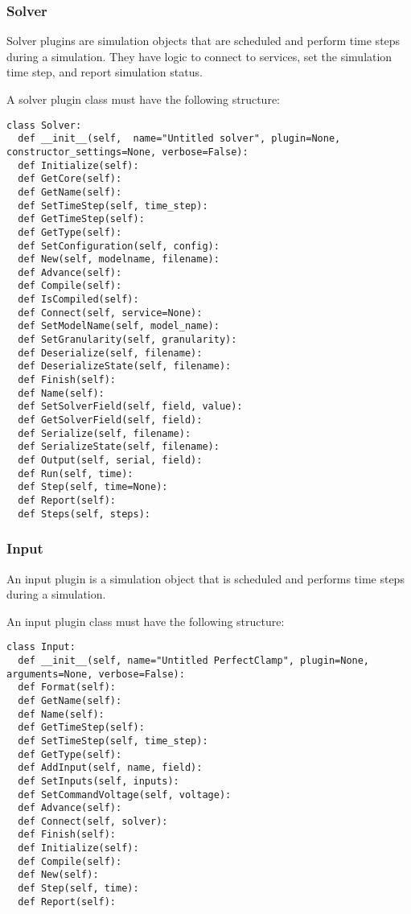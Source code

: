\documentclass[12pt]{article}
\begin{document}
\subsubsection*{Solver}

Solver plugins are simulation objects that are scheduled and perform time steps during a simulation. They have logic to connect to services, set the simulation time step, and report simulation status. 

A solver plugin class must have the following structure:

\begin{verbatim}
class Solver:
  def __init__(self,  name="Untitled solver", plugin=None, constructor_settings=None, verbose=False):
  def Initialize(self):
  def GetCore(self):
  def GetName(self):
  def SetTimeStep(self, time_step):
  def GetTimeStep(self):
  def GetType(self):
  def SetConfiguration(self, config):
  def New(self, modelname, filename):
  def Advance(self):
  def Compile(self):
  def IsCompiled(self):
  def Connect(self, service=None):
  def SetModelName(self, model_name):
  def SetGranularity(self, granularity):
  def Deserialize(self, filename):
  def DeserializeState(self, filename):
  def Finish(self):
  def Name(self):
  def SetSolverField(self, field, value):
  def GetSolverField(self, field):
  def Serialize(self, filename):
  def SerializeState(self, filename):
  def Output(self, serial, field):
  def Run(self, time):
  def Step(self, time=None):
  def Report(self):
  def Steps(self, steps):
\end{verbatim}


\subsubsection*{Input}

An input plugin is a simulation object that is scheduled and performs time steps during a simulation.

An input plugin class must have the following structure:

\begin{verbatim}
class Input:
  def __init__(self, name="Untitled PerfectClamp", plugin=None, arguments=None, verbose=False):
  def Format(self):
  def GetName(self):
  def Name(self):
  def GetTimeStep(self):
  def SetTimeStep(self, time_step):
  def GetType(self):
  def AddInput(self, name, field):
  def SetInputs(self, inputs):
  def SetCommandVoltage(self, voltage):
  def Advance(self):
  def Connect(self, solver):
  def Finish(self):
  def Initialize(self):
  def Compile(self):
  def New(self):
  def Step(self, time):
  def Report(self):
\end{verbatim}
\end{document}
